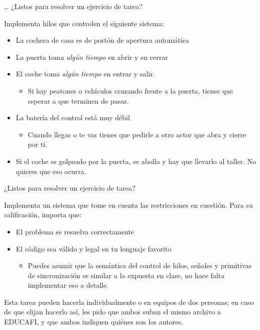 \documentclass[presentation]{beamer}
\begin{document}
\begin{frame}[label={sec:org49f99cc}]{\ldots{} ¿Listos para resolver un ejercicio de tarea?}
\begin{center}
Implementa hilos que controlen el siguiente sistema:
\end{center}

\begin{itemize}
\item La cochera de casa es de portón de apertura automática
\item La puerta toma \emph{algún tiempo} en abrir y en cerrar
\item El coche toma \emph{algún tiempo} en entrar y salir.
\begin{itemize}
\item Si hay peatones o vehículos cruzando frente a la puerta, tienes
que esperar a que terminen de pasar.
\end{itemize}
\item La batería del control está muy débil
\begin{itemize}
\item Cuando llegas o te vas tienes que pedirle a otro actor que abra y
cierre por tí.
\end{itemize}
\item Si el coche es golpeado por la puerta, se abolla y hay que llevarlo
al taller. No quieres que eso ocurra.
\end{itemize}
\end{frame}


\begin{frame}[label={sec:orgb804679}]{¿Listos para resolver un ejercicio de tarea?}
\begin{center}
Implementa un sistema que tome en cuenta las restricciones en
cuestión. Para su calificación, importa que:
\end{center}

\begin{itemize}
\item El problema se resuelva correctamente
\item El código sea válido y legal en tu lenguaje favorito
\begin{itemize}
\item Puedes asumir que la semántica del control de hilos, señales y
primitivas de sincronización es similar a la expuesta en clase, no
hace falta implementar eso a detalle.
\end{itemize}
\end{itemize}

Esta tarea pueden hacerla individualmente o en equipos de dos
personas; en caso de que elijan hacerlo así, les pido que ambos suban
el mismo archivo a EDUCAFI, y que ambos indiquen quiénes son los
autores.
\end{frame}
\end{document}
